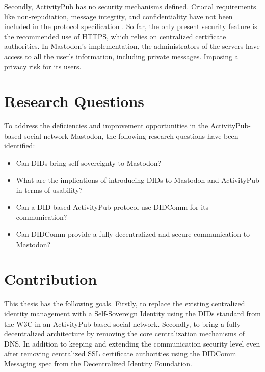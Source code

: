 Secondly, ActivityPub has no security mechanisms defined. Crucial requirements like non-repudiation, message integrity, and confidentiality have not been included in the protocol specification \cite{sporny_longley_sabadello_reed_steele_2021}. So far, the only present security feature is the recommended use of HTTPS, which relies on centralized certificate authorities. In Mastodon's implementation, the administrators of the servers have access to all the user's information, including private messages. Imposing a privacy risk for its users. 


\section{Research Questions}
To address the deficiencies and improvement opportunities in the ActivityPub-based social network Mastodon, the following research questions have been identified: 

\begin{itemize}
  \item Can DIDs bring self-sovereignty to Mastodon?
  \item What are the implications of introducing DIDs to Mastodon and ActivityPub in terms of usability?
  \item Can a DID-based ActivityPub protocol use DIDComm for its communication?
  \item Can DIDComm provide a fully-decentralized and secure communication to Mastodon?
\end{itemize}

\section{Contribution}

This thesis has the following goals. Firstly, to replace the existing centralized identity management with a Self-Sovereign Identity using the DIDs standard from the W3C in an ActivityPub-based social network. Secondly, to bring a fully decentralized architecture by removing the core centralization mechanisms of DNS. In addition to keeping and extending the communication security level even after removing centralized SSL certificate authorities using the DIDComm Messaging spec from the Decentralized Identity Foundation. 
 
